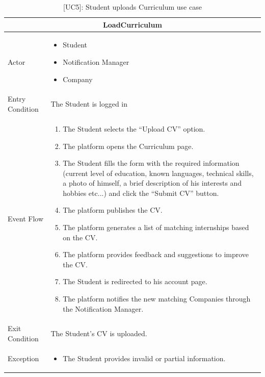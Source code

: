 \begin{table}[H]
    \centering
    \begin{tabular}{|p{3cm}|p{12cm}|}
    \hline
    \multicolumn{2}{|c|}{\textbf{LoadCurriculum}} \\ \hline
    Actor & 
    \begin{itemize}
        \item Student
        \item Notification Manager
        \item Company
    \end{itemize}\\ \hline
    Entry Condition & The Student is logged in \\ \hline
    Event Flow &
    \begin{enumerate}         
        \item The Student selects the “Upload CV” option.
        \item The platform opens the Curriculum page.
        \item The Student fills the form with the required information (current level of education, known languages, technical skills, a photo of himself, a brief description of his interests and hobbies etc...) and click the “Submit CV” button.
        \item The platform publishes the CV.
        \item The platform generates a list of matching internships based on the CV.
        \item The platform provides feedback and suggestions to improve the CV.
        \item The Student is redirected to his account page.
        \item The platform notifies the new matching Companies through the Notification Manager. 
    \end{enumerate} \\ \hline
    Exit Condition & The Student's CV is uploaded. \\ \hline
    Exception & 
    \begin{itemize} 
        \item The Student provides invalid or partial information.
    \end{itemize} \\ \hline
    \end{tabular}
    \caption{[UC5]: Student uploads Curriculum use case}
    \label{tab:UC5}
\end{table}

